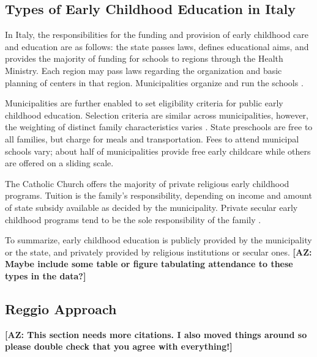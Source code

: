 




\subsection{Types of Early Childhood Education in Italy}

In Italy, the responsibilities for the funding and provision of early childhood care and education are as follows: the state passes laws, defines educational aims, and provides the majority of funding for schools to regions through the Health Ministry. Each region may pass laws regarding the organization and basic planning of centers in that region. Municipalities organize and run the schools \citep{Becchi-Ferrari_1990_Pub-Inf-Centres-Italy}. 

Municipalities are further enabled to set eligibility criteria for public early childhood education. Selection criteria are similar across municipalities, however, the weighting of distinct family characteristics varies \citep{Del-Boca-etal_2016_CESifo-ES}. State preschools are free to all families, but charge for meals and transportation. Fees to attend municipal schools vary; about half of municipalities provide free early childcare while others are offered on a sliding scale.

The Catholic Church offers the majority of private religious early childhood programs. Tuition is the family's responsibility, depending on income and amount of state subsidy available as decided by the municipality. Private secular early childhood programs tend to be the sole responsibility of the family \citep{Hohnerlein_2009_Paradox-Public-Preschools}.

To summarize, early childhood education is publicly provided by the municipality or the state, and privately provided by religious institutions or secular ones. \textbf{[AZ: Maybe include some table or figure tabulating attendance to these types in the data?]}

\subsection{Reggio Approach}
\textbf{[AZ: This section needs more citations. I also moved things around so please double check that you agree with everything!]}

